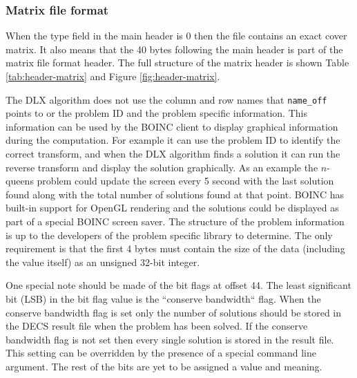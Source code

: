\subsubsection{Matrix file format}

When the type field in the main header is 0 then the file contains an exact cover matrix.
It also means that the 40 bytes following the main header is part of the matrix file format header.
The full structure of the matrix header is shown Table \ref{tab:header-matrix} and Figure \ref{fig:header-matrix}.

The DLX algorithm does not use the column and row names that \texttt{name\_off} points to or the problem ID and the problem specific information.
This information can be used by the BOINC client to display graphical information during the computation.
For example it can use the problem ID to identify the correct transform, and when the DLX algorithm finds a solution it can run the reverse transform and display the solution graphically.
As an example the $n$-queens problem could update the screen every 5 second with the last solution found along with the total number of solutions found at that point.
BOINC has built-in support for OpenGL rendering and the solutions could be displayed as part of a special BOINC screen saver.
The structure of the problem information is up to the developers of the problem specific library to determine.
The only requirement is that the first 4 bytes must contain the size of the data (including the value itself) as an unsigned 32-bit integer.

One special note should be made of the bit flags at offset 44.
The least significant bit (LSB) in the bit flag value is the ``conserve bandwidth`` flag.
When the conserve bandwidth flag is set only the number of solutions should be stored in the DECS result file when the problem has been solved.
If the conserve bandwidth flag is not set then every single solution is stored in the result file.
This setting can be overridden by the presence of a special command line argument.
The rest of the bits are yet to be assigned a value and meaning.

